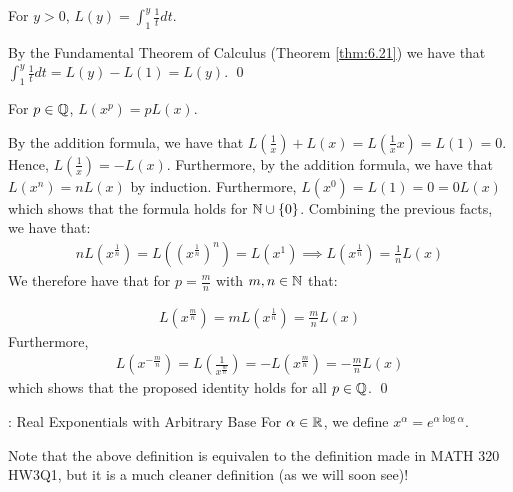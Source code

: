\begin{ncorollary}{}{}
    For $y > 0$, $L(y) = \int_1^y \frac{1}{t}dt$.
\end{ncorollary}
\begin{nproof}
    By the Fundamental Theorem of Calculus (Theorem \ref{thm:6.21}) we have that $\int_1^y \frac{1}{t}dt = L(y) - L(1) = L(y)$. \qed
\end{nproof}

\begin{ntheorem}{}{}
    For $p \in \mathbb{Q}$, $L(x^p) = pL(x)$.
\end{ntheorem}
\begin{nproof}
    By the addition formula, we have that $L(\frac{1}{x}) + L(x) = L(\frac{1}{x}x) = L(1) = 0$. Hence, $L(\frac{1}{x}) = -L(x)$. Furthermore, by the addition formula, we have that $L(x^n) = nL(x)$ by induction. Furthermore, $L(x^0) = L(1) = 0 = 0L(x)$ which shows that the formula holds for $\mathbb{N} \cup \set{0}$. Combining the previous facts, we have that:
    \begin{align*}
        nL(x^{\frac{1}{n}}) = L((x^{\frac{1}{n}})^n) = L(x^1) \implies L(x^{\frac{1}{n}}) = \frac{1}{n}L(x)
    \end{align*} 
    We therefore have that for $p = \frac{m}{n}$ with $m, n \in \mathbb{N}$ that:
    
    \begin{align*}
        L(x^{\frac{m}{n}}) = mL(x^{\frac{1}{n}}) = \frac{m}{n}L(x)
    \end{align*}
    Furthermore,
    \begin{align*}
        L(x^{-\frac{m}{n}}) = L\left(\frac{1}{x^{\frac{m}{n}}}\right) = -L(x^{\frac{m}{n}}) = -\frac{m}{n}L(x)
    \end{align*}
    which shows that the proposed identity holds for all $p \in \mathbb{Q}$. \qed
\end{nproof}

\begin{ndef}{: Real Exponentials with Arbitrary Base}{}
    For $\alpha \in \mathbb{R}$, we define $x^\alpha = e^{\alpha \log \alpha}$.
\end{ndef}
\noindent Note that the above definition is equivalen to the definition made in MATH 320 HW3Q1, but it is a much cleaner definition (as we will soon see)!

